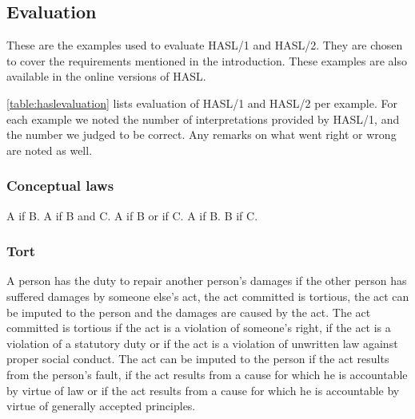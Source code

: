 \subsection{Evaluation}
\label{sec:appevaluation}
These are the examples used to evaluate HASL/1 and HASL/2. They are chosen to cover the requirements mentioned in the introduction. These examples are also available in the online versions of HASL.

\autoref{table:haslevaluation} lists evaluation of HASL/1 and HASL/2 per example. For each example we noted the number of interpretations provided by HASL/1, and the number we judged to be correct. Any remarks on what went right or wrong are noted as well.

\subsubsection{Conceptual laws}
\begin{exe}
\ex\label{1.1} A if B.
\ex\label{1.2} A if B and C.
\ex\label{1.3} A if B or if C.
\ex\label{1.4} A if B. B if C.
\end{exe}

\subsubsection{Tort}
\begin{exe}
\ex\label{2.1} A person has the duty to repair another person's damages if the other person has suffered damages by someone else's act, the act committed is tortious, the act can be imputed to the person and the damages are caused by the act. The act committed is tortious if the act is a violation of someone’s right, if the act is a violation of a statutory duty or if the act is a violation of unwritten law against proper social conduct. The act can be imputed to the person if the act results from the person's fault, if the act results from a cause for which he is accountable by virtue of law or if the act results from a cause for which he is accountable by virtue of generally accepted principles.
\end{exe}

\clearpage